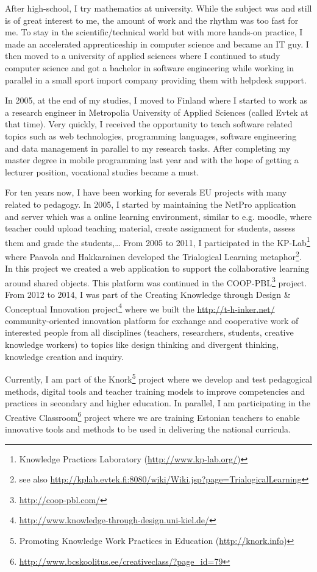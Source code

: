 After high-school, I try mathematics at university. While the subject was and still is of great interest to me, the amount of work and the rhythm was too fast for me. 
To stay in the scientific/technical world but with more hands-on practice, I made an accelerated apprenticeship in computer science and became an IT guy. 
I then moved to a university of applied sciences where I continued to study computer science and got a bachelor in software engineering while working in parallel in a small sport import company providing them with helpdesk support.

In 2005, at the end of my studies, I moved to Finland where I started to work as a research engineer in Metropolia University of Applied Sciences (called Evtek at that time). 
Very quickly, I received the opportunity to teach software related topics such as web technologies, programming languages, software engineering and data management in parallel to my research tasks. 
After completing my master degree in mobile programming last year and with the hope of getting a lecturer position, vocational studies became a must.

For ten years now, I have been working for severals EU projects with many related to pedagogy. 
In 2005, I started by maintaining the NetPro application and server which was a online learning environment, similar to e.g. moodle, where teacher could upload teaching material, create assignment for students, assess them and grade the students,\ldots
From 2005 to 2011, I participated in the KP-Lab\footnote{Knowledge Practices Laboratory (\url{http://www.kp-lab.org/})} where Paavola and Hakkarainen \cite{Paavola_2005} developed the Trialogical Learning metaphor\footnote{see also \url{http://kplab.evtek.fi:8080/wiki/Wiki.jsp?page=TrialogicalLearning}}. In this project we created a web application to support the collaborative learning around shared objects.
This platform was continued in the COOP-PBL\footnote{\url{http://coop-pbl.com/}} project.
From 2012 to 2014, I was part of the Creating Knowledge through Design & Conceptual Innovation project\footnote{\url{http://www.knowledge-through-design.uni-kiel.de/}} where we built the \url{http://t-h-inker.net/} community-oriented innovation platform for exchange and cooperative work of interested people from all disciplines (teachers, researchers, students, creative knowledge workers) to topics like design thinking and divergent thinking, knowledge creation and inquiry. 

Currently, I am part of the Knork\footnote{Promoting Knowledge Work Practices in Education (\url{http://knork.info})} project where we develop and test pedagogical methods, digital tools and teacher training models to improve competencies and practices in secondary and higher education. In parallel, I am participating in the Creative Classroom\footnote{\url{http://www.bcskoolitus.ee/creativeclass/?page_id=79}} project where we are training Estonian teachers  to enable innovative tools and methods to be used in delivering the national curricula.






  
  
  
  
  
  
  